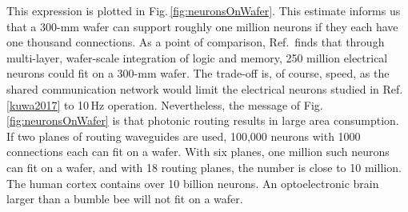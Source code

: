 \documentclass[twocolumn]{article}
\begin{document}
This expression is plotted in Fig.\,\ref{fig:neuronsOnWafer}. This estimate informs us that a 300-mm wafer can support roughly one million neurons if they each have one thousand connections. As a point of comparison, Ref.\,\cite{kuwa2017} finds that through multi-layer, wafer-scale integration of logic and memory, 250 million electrical neurons could fit on a 300-mm wafer. The trade-off is, of course, speed, as the shared communication network would limit the electrical neurons studied in Ref.\,\ref{kuwa2017} to 10\,Hz operation. Nevertheless, the message of Fig.\,\ref{fig:neuronsOnWafer} is that photonic routing results in large area consumption. If two planes of routing waveguides are used, 100,000 neurons with 1000 connections each can fit on a wafer. With six planes, one million such neurons can fit on a wafer, and with 18 routing planes, the number is close to 10 million. The human cortex contains over 10 billion neurons. An optoelectronic brain larger than a bumble bee will not fit on a wafer.
\end{document}
